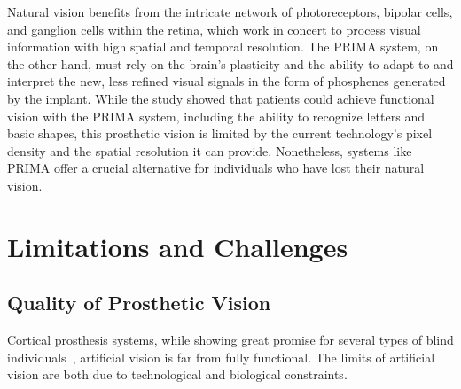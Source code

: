 \documentclass[twocolumn,10pt]{article}
\begin{document}
Natural vision benefits from the intricate network of photoreceptors, bipolar
cells, and ganglion cells within the retina, which work in concert to process
visual information with high spatial and temporal resolution. The PRIMA system,
on the other hand, must rely on the brain's plasticity and the ability to adapt
to and interpret the new, less refined visual signals in the form of phosphenes
generated by the implant. While the study showed that patients could achieve
functional vision with the PRIMA system, including the ability to recognize
letters and basic shapes, this prosthetic vision is limited by the current
technology's pixel density and the spatial resolution it can provide.
Nonetheless, systems like PRIMA offer a crucial alternative for individuals who
have lost their natural vision.

\section*{Limitations and Challenges}\label{sec:limitations}
\subsection*{Quality of Prosthetic Vision}
Cortical prosthesis systems, while showing great promise for several types of
blind
individuals~\parencite{deruytervansteveninckRealworldIndoorMobility2022,deruytervansteveninckEndtoendOptimizationProsthetic2022,kucukogluOptimizationNeuroprostheticVision2022},
artificial vision is far from fully functional. The limits of artificial vision
are both due to technological and biological constraints.
\end{document}
